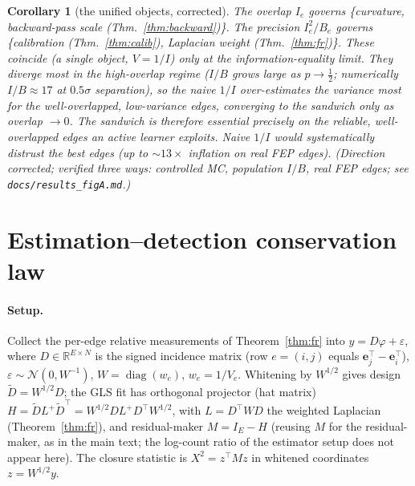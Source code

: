 \documentclass[11pt]{article}
\theoremstyle{plain}
\newtheorem{corollary}{Corollary}
\theoremstyle{remark}
\begin{document}
\begin{corollary}[the unified objects, corrected]
The overlap $I_e$ governs \{curvature, backward-pass scale (Thm.~\ref{thm:backward})\}. The precision $I_e^2/B_e$ governs \{calibration (Thm.~\ref{thm:calib}), Laplacian weight (Thm.~\ref{thm:fr})\}. These coincide (a single object, $V=1/I$) only at the information-equality limit. They diverge \emph{most in the high-overlap regime} ($I/B$ grows large as $p\to\tfrac12$; numerically $I/B\approx17$ at $0.5\sigma$ separation), so the naive $1/I$ over-estimates the variance most for the well-overlapped, low-variance edges, converging to the sandwich only as overlap $\to0$. The sandwich is therefore essential precisely on the \emph{reliable}, well-overlapped edges an active learner exploits. Naive $1/I$ would systematically distrust the best edges (up to ${\sim}13\times$ inflation on real FEP edges). \emph{(Direction corrected; verified three ways: controlled MC, population $I/B$, real FEP edges; see \texttt{docs/results\_figA.md}.)}
\end{corollary}

\section*{Estimation--detection conservation law}

\paragraph{Setup.} Collect the per-edge relative measurements of Theorem~\ref{thm:fr} into
$y=D\varphi+\varepsilon$, where $D\in\mathbb R^{E\times N}$ is the signed incidence matrix (row $e=(i,j)$
equals $\mathbf e_j^\top-\mathbf e_i^\top$), $\varepsilon\sim\mathcal N(0,W^{-1})$,
$W=\operatorname{diag}(w_e)$, $w_e=1/V_e$. Whitening by $W^{1/2}$ gives design $\tilde D=W^{1/2}D$; the
GLS fit has orthogonal projector (hat matrix) $H=\tilde D L^{+}\tilde D^{\top}=W^{1/2}DL^{+}D^{\top}W^{1/2}$,
with $L=D^\top W D$ the weighted Laplacian (Theorem~\ref{thm:fr}), and residual-maker $M=I_E-H$
(reusing $M$ for the residual-maker, as in the main text; the log-count ratio of the estimator setup
does not appear here). The closure statistic is $X^2=z^\top M z$ in whitened coordinates $z=W^{1/2}y$.
\end{document}
